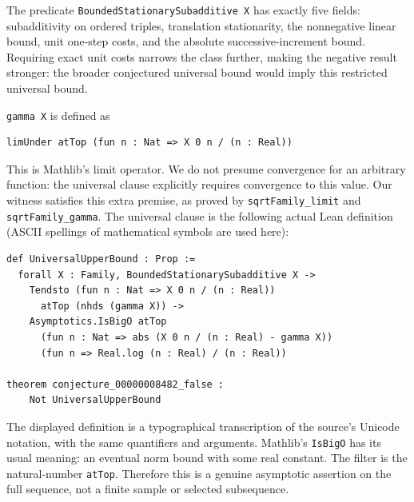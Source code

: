 \documentclass[11pt]{article}
\begin{document}
The predicate \texttt{BoundedStationarySubadditive X} has exactly five
fields: subadditivity on ordered triples, translation stationarity,
the nonnegative linear bound, unit one-step costs, and the absolute
successive-increment bound. Requiring exact unit costs narrows the class
further, making the negative result stronger: the broader conjectured
universal bound would imply this restricted universal bound.

\texttt{gamma X} is defined as
\begin{lstlisting}
limUnder atTop (fun n : Nat => X 0 n / (n : Real))
\end{lstlisting}
This is Mathlib's limit operator. We do not presume convergence for an
arbitrary function: the universal clause explicitly requires convergence
to this value. Our witness satisfies this extra premise, as proved by
\texttt{sqrtFamily\_limit} and \texttt{sqrtFamily\_gamma}.
The universal clause is the following actual Lean definition (ASCII
spellings of mathematical symbols are used here):
\begin{lstlisting}
def UniversalUpperBound : Prop :=
  forall X : Family, BoundedStationarySubadditive X ->
    Tendsto (fun n : Nat => X 0 n / (n : Real))
      atTop (nhds (gamma X)) ->
    Asymptotics.IsBigO atTop
      (fun n : Nat => abs (X 0 n / (n : Real) - gamma X))
      (fun n => Real.log (n : Real) / (n : Real))

theorem conjecture_00000008482_false :
    Not UniversalUpperBound
\end{lstlisting}
The displayed definition is a typographical transcription of the
source's Unicode notation, with the same quantifiers and arguments.
Mathlib's \texttt{IsBigO} has its usual meaning: an eventual norm bound
with some real constant. The filter is the natural-number \texttt{atTop}.
Therefore this is a genuine asymptotic assertion on the full sequence,
not a finite sample or selected subsequence.
\end{document}
